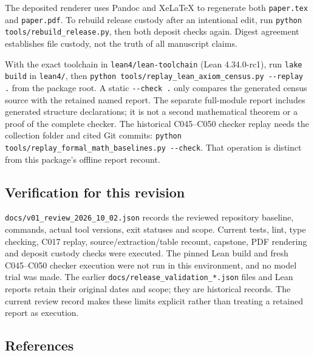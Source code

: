 \documentclass[
  11pt,
]{article}
\begin{document}
The deposited renderer uses Pandoc and XeLaTeX to regenerate both
\texttt{paper.tex} and \texttt{paper.pdf}. To rebuild release custody
after an intentional edit, run
\texttt{python tools/\allowbreak{}rebuild\_\allowbreak{}release.py},
then both deposit checks again. Digest agreement establishes file
custody, not the truth of all manuscript claims.

With the exact toolchain in
\texttt{lean4/\allowbreak{}lean-\allowbreak{}toolchain} (Lean
4.34.0-rc1), run \texttt{lake build} in \texttt{lean4/\allowbreak{}},
then
\texttt{python tools/\allowbreak{}replay\_\allowbreak{}lean\_\allowbreak{}axiom\_\allowbreak{}census.py -\allowbreak{}-\allowbreak{}replay .}
from the package root. A static
\texttt{-\allowbreak{}-\allowbreak{}check .} only compares the generated
census source with the retained named report. The separate full-module
report includes generated structure declarations; it is not a second
mathematical theorem or a proof of the complete checker. The historical
C045--C050 checker replay needs the collection folder and cited Git
commits:
\texttt{python tools/\allowbreak{}replay\_\allowbreak{}formal\_\allowbreak{}math\_\allowbreak{}baselines.py -\allowbreak{}-\allowbreak{}check}.
That operation is distinct from this package's offline report recount.

\hypertarget{verification-for-this-revision}{%
\subsection{Verification for this
revision}\label{verification-for-this-revision}}

\texttt{docs/\allowbreak{}v01\_\allowbreak{}review\_\allowbreak{}2026\_\allowbreak{}10\_\allowbreak{}02.json}
records the reviewed repository baseline, commands, actual tool
versions, exit statuses and scope. Current tests, lint, type checking,
C017 replay, source/extraction/table recount, capstone, PDF rendering
and deposit custody checks were executed. The pinned Lean build and
fresh C045--C050 checker execution were not run in this environment, and
no model trial was made. The earlier
\texttt{docs/\allowbreak{}release\_\allowbreak{}validation\_\allowbreak{}*.json}
files and Lean reports retain their original dates and scope; they are
historical records. The current review record makes these limits
explicit rather than treating a retained report as execution.

\hypertarget{references}{%
\subsection{References}\label{references}}
\end{document}
